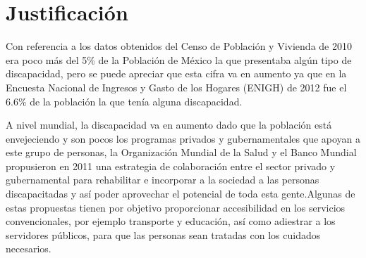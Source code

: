 
\section{Justificaci\'on}




 Con referencia a los datos obtenidos del Censo de Poblaci\'on
 y Vivienda de 2010 era poco m\'as del 5\% de la Poblaci\'on de M\'exico la 
 que presentaba alg\'un tipo de discapacidad, pero se puede apreciar que esta 
 cifra va en aumento ya que en la Encuesta Nacional de Ingresos y Gasto de 
 los Hogares (ENIGH) de 2012 fue el 6.6\% de la poblaci\'on la que ten\'ia 
 alguna discapacidad\cite{Milosavljevic2014}.

A nivel mundial, la discapacidad va en aumento dado que la poblaci\'on est\'a
 envejeciendo y son pocos los programas privados y gubernamentales que apoyan 
 a este grupo de personas\cite{OrganizacionMundialdelaSalud2011}, la
 Organizaci\'on Mundial de la Salud y el Banco Mundial
 propusieron en 2011 \cite{OrganizacionMundialdelaSalud2011} una
 estrategia de colaboraci\'on entre el sector privado y gubernamental para
 rehabilitar e incorporar a la sociedad a las personas discapacitadas y as\'i
 poder aprovechar el potencial de toda esta gente.Algunas de estas propuestas
 tienen por objetivo proporcionar accesibilidad en los servicios 
 convencionales, por ejemplo transporte y educaci\'on, as\'i como adiestrar a 
 los servidores p\'ublicos, para que las personas sean tratadas con los 
 cuidados necesarios.
 